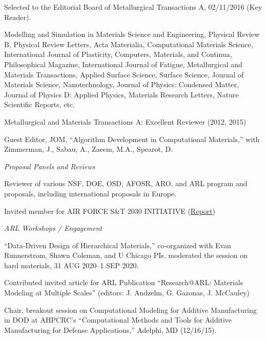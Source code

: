 \begin{list2}
\item Selected to the Editorial Board of Metallurgical Transactions A, 02/11/2016 (Key Reader).

\item Modelling and Simulation in Materials Science and Engineering, Physical Review B, Physical Review Letters, Acta Materialia, Computational Materials Science, International Journal of Plasticity, Computers, Materials, and Continua, Philosophical Magazine, International Journal of Fatigue, Metallurgical and Materials Transactions, Applied Surface Science, Surface Science, Journal of Materials Science, Nanotechnology, Journal of Physics: Condensed Matter, Journal of Physics D: Applied Physics, Materials Research Letters, Nature Scientific Reports, etc.

\item Metallurgical and Materials Transactions A: Excellent Reviewer (2012, 2015)

\item Guest Editor, JOM, ``Algorithm Development in Computational Materials,'' with Zimmerman, J., Sabau, A., Zaeem, M.A., Spearot, D.

\end{list2}

\textit{Proposal Panels and Reviews}

Reviewer of various NSF, DOE, OSD, AFOSR, ARO, and ARL program and proposals, including international proposals in Europe.

Invited member for AIR FORCE S\&T 2030 INITIATIVE (\href{https://apps.dtic.mil/sti/pdfs/AD1062947.pdf}{Report})

\textit{ARL Workshops / Engagement}
\begin{list2}
\item ``Data-Driven Design of Hierarchical Materials,'' co-organized with Evan Runnerstrom, Shawn Coleman, and U Chicago PIs, moderated the session on hard materials, 31 AUG 2020--1 SEP 2020.
\item Contributed invited article for ARL Publication ``Research@ARL: Materials Modeling at Multiple Scales'' (editors: J. Andzelm, G. Gazonas, J. McCauley)
\item Chair, breakout session on Computational Modeling for Additive Manufacturing in DOD at AHPCRC's ``Computational Methods and Tools for Additive Manufacturing for Defense Applications,'' Adelphi, MD (12/16/15).
\end{list2}


